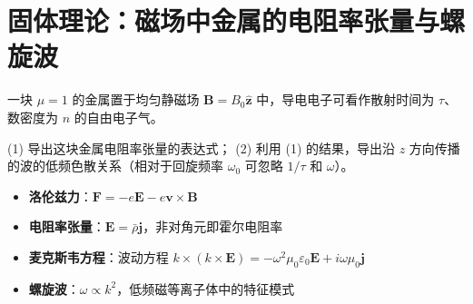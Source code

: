 \section{固体理论：磁场中金属的电阻率张量与螺旋波}
\label{sec:resistivity-tensor-helicon}

\begin{modelbox}[题目：磁场中金属的电阻率张量与低频电磁波色散]
一块 $\mu=1$ 的金属置于均匀静磁场 $\bm{B}=B_0\hat{\bm{z}}$ 中，导电电子可看作散射时间为 $\tau$、数密度为 $n$ 的自由电子气。

(1) 导出这块金属电阻率张量的表达式；
(2) 利用 (1) 的结果，导出沿 $z$ 方向传播的波的低频色散关系（相对于回旋频率 $\omega_0$ 可忽略 $1/\tau$ 和 $\omega$）。
\end{modelbox}

\begin{tipbox}[考点快速分析]
\begin{itemize}
    \item \textbf{洛伦兹力}：$\bm{F}=-e\bm{E}-e\bm{v}\times\bm{B}$
    \item \textbf{电阻率张量}：$\bm{E}=\bar{\rho}\bm{j}$，非对角元即霍尔电阻率
    \item \textbf{麦克斯韦方程}：波动方程 $k\times(k\times\bm{E})=-\omega^2\mu_0\varepsilon_0\bm{E}+i\omega\mu_0\bm{j}$
    \item \textbf{螺旋波}：$\omega\propto k^2$，低频磁等离子体中的特征模式
\end{itemize}
\end{tipbox}

